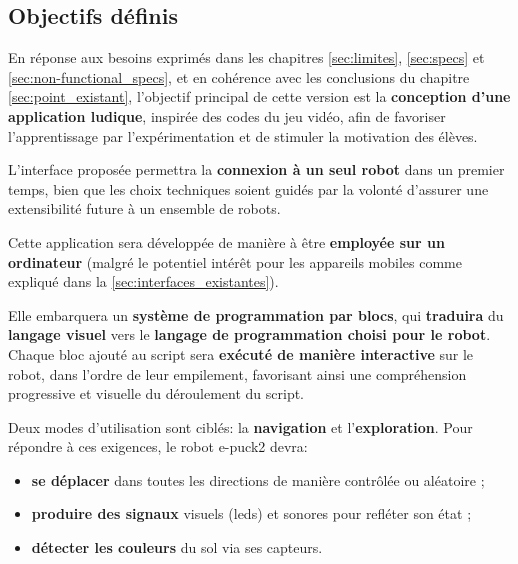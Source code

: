 \subsection{Objectifs définis} \label{sec:objectifs_finaux}

En réponse aux besoins exprimés dans les chapitres \ref{sec:limites}, \ref{sec:specs} et \ref{sec:non-functional_specs}, et en cohérence avec les conclusions du chapitre \ref{sec:point_existant}, l’objectif principal de cette version est la \textbf{conception d’une application ludique}, inspirée des codes du jeu vidéo, afin de favoriser l’apprentissage par l’expérimentation et de stimuler la motivation des élèves.

L’interface proposée permettra la \textbf{connexion à un seul robot} dans un premier temps, bien que les choix techniques soient guidés par la volonté d’assurer une extensibilité future à un ensemble de robots.

Cette application sera développée de manière à être \textbf{employée sur un ordinateur} (malgré le potentiel intérêt pour les appareils mobiles comme expliqué dans la \autoref{sec:interfaces_existantes}).

Elle embarquera un \textbf{système de programmation par blocs}, qui \textbf{traduira} du \textbf{langage visuel} vers le \textbf{langage de programmation choisi pour le robot}.
Chaque bloc ajouté au script sera \textbf{exécuté de manière interactive} sur le robot, dans l’ordre de leur empilement, favorisant ainsi une compréhension progressive et visuelle du déroulement du script.

Deux modes d’utilisation sont ciblés: la \textbf{navigation} et l’\textbf{exploration}. 
Pour répondre à ces exigences, le robot e-puck2 devra:
\begin{itemize}
    \item \textbf{se déplacer} dans toutes les directions de manière contrôlée ou aléatoire ;
    \item \textbf{produire des signaux} visuels (\acrshort{led}s) et sonores pour refléter son état ;
    \item \textbf{détecter les couleurs} du sol via ses capteurs.
\end{itemize}

